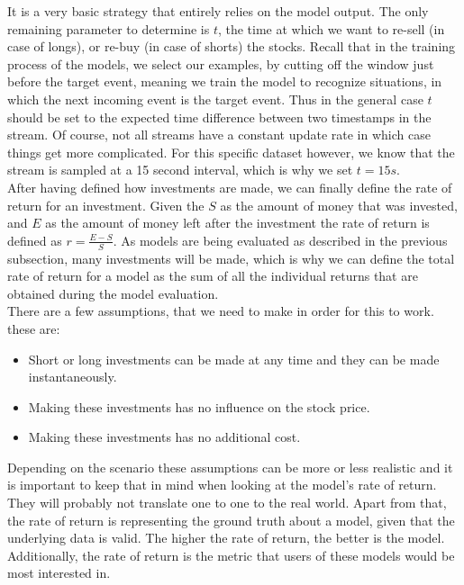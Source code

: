 It is a very basic strategy that entirely relies on the model output. The only remaining parameter to determine is $t$, the time at which we want to re-sell (in case of longs), or re-buy (in case of shorts) the stocks. Recall that in the training process of the models, we select our examples, by cutting off the window just before the target event, meaning we train the model to recognize situations, in which the next incoming event is the target event. Thus in the general case $t$ should be set to the expected time difference between two timestamps in the stream. Of course, not all streams have a constant update rate in which case things get more complicated. For this specific dataset however, we know that the stream is sampled at a 15 second interval, which is why we set $t = 15s$. \\
After having defined how investments are made, we can finally define the rate of return for an investment. Given the $S$ as the amount of money that was invested, and $E$ as the amount of money left after the investment the rate of return is defined as $r = \frac{E-S}{S}$. As models are being evaluated as described in the previous subsection, many investments will be made, which is why we can define the total rate of return for a model as the sum of all the individual returns that are obtained during the model evaluation.\\
There are a few assumptions, that we need to make in order for this to work. these are:

\begin{itemize}
	\item Short or long investments can be made at any time and they can be made instantaneously.
	\item Making these investments has no influence on the stock price.
	\item Making these investments has no additional cost.
\end{itemize}

Depending on the scenario these assumptions can be more or less realistic and it is important to keep that in mind when looking at the model's rate of return. They will probably not translate one to one to the real world. Apart from that, the rate of return is representing the ground truth about a model, given that the underlying data is valid. The higher the rate of return, the better is the model. Additionally, the rate of return is the metric that users of these models would be most interested in.

